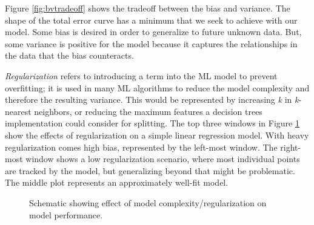 Figure \ref{fig:bvtradeoff} shows the tradeoff between the bias and variance.
The shape of the total error curve has a minimum that we seek to achieve with
our model. Some bias is desired in order to generalize to future unknown data.
But, some variance is positive for the model because it captures the
relationships in the data that the bias counteracts. 

\textit{Regularization} refers to introducing a term into the \gls{ML} model to
prevent overfitting; it is used in many \gls{ML} algorithms to reduce the model
complexity and therefore the resulting variance.  This would be represented by
increasing \textit{k} in \textit{k}-nearest neighbors, or reducing the maximum
features a decision trees implementation could consider for splitting.  The top
three windows in Figure \ref{fig:complex} show the effects of regularization on
a simple linear regression model. With heavy regularization comes high bias,
represented by the left-most window.  The right-most window shows a low
regularization scenario, where most individual points are tracked by the model,
but generalizing beyond that might be problematic. The middle plot represents an 
approximately well-fit model.  

\begin{figure}[!htb]
  \centering
  \caption{Schematic showing effect of model complexity/regularization on model 
           performance.}
  \label{fig:complex}
\end{figure}

